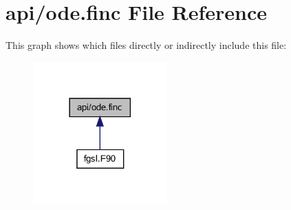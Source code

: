 \hypertarget{ode_8finc}{}\section{api/ode.finc File Reference}
\label{ode_8finc}
This graph shows which files directly or indirectly include this file\+:\nopagebreak
\begin{figure}[H]
\begin{center}
\leavevmode
\includegraphics[width=146pt]{ode_8finc__dep__incl}
\end{center}
\end{figure}
